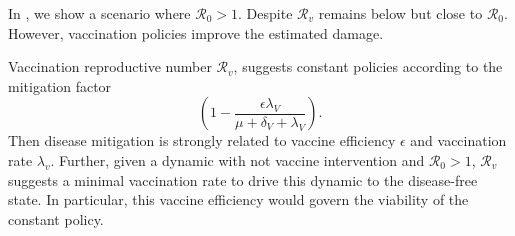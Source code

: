 In , we show a scenario where $\mathcal{R}_0>1$. Despite $\mathcal{R}_v$ remains below but close to $\mathcal{R}_0$.
However, vaccination policies improve the estimated damage.

Vaccination reproductive number $\mathcal{R}_v$, suggests constant policies
according to the mitigation factor
$$
    \left(
        1 -
        \frac{\epsilon \lambda_V}{\mu+\delta_V+\lambda_V}
    \right).
$$
Then disease mitigation is strongly related to vaccine efficiency
$\epsilon$ and vaccination rate $\lambda_v$. Further, given a dynamic with
not vaccine intervention and $\mathcal{R}_0>1$, $\mathcal{R}_v$ suggests a minimal vaccination rate to drive this dynamic to the disease-free state.
In particular, this vaccine efficiency would govern the viability of the
constant policy.




